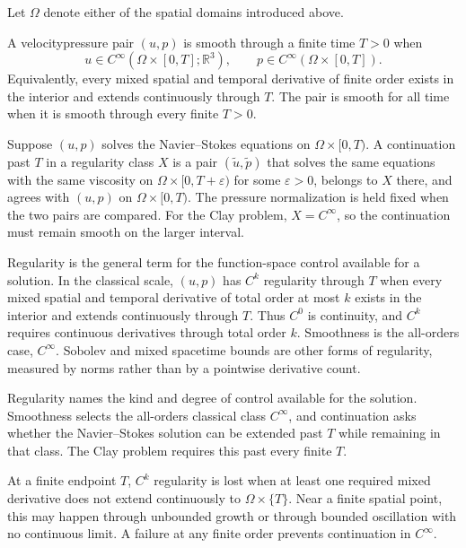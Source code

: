 
Let \(\Omega\) denote either of the spatial domains introduced above.

\begin{definition}[Smoothness]\label{def:Smoothness}
A velocity\textendash pressure pair \((u,p)\) is smooth through a finite time \(T>0\) when
\[
  u\in C^\infty\!\left(\Omega\times[0,T];\mathbb R^3\right),
  \qquad
  p\in C^\infty\!\left(\Omega\times[0,T]\right).
\]
Equivalently, every mixed spatial and temporal derivative of finite order exists in the interior and extends continuously through \(T\).
The pair is smooth for all time when it is smooth through every finite \(T>0\).
\end{definition}

\begin{definition}[Continuation]\label{def:Continuation}
Suppose \((u,p)\) solves the Navier--Stokes equations on \(\Omega\times[0,T)\).
A continuation past \(T\) in a regularity class \(X\) is a pair \((\widetilde u,\widetilde p)\) that solves the same equations with the same viscosity on \(\Omega\times[0,T+\varepsilon)\) for some \(\varepsilon>0\), belongs to \(X\) there, and agrees with \((u,p)\) on \(\Omega\times[0,T)\).
The pressure normalization is held fixed when the two pairs are compared.
For the Clay problem, \(X=C^\infty\), so the continuation must remain smooth on the larger interval.
\end{definition}

\begin{definition}[Regularity]\label{def:Regularity}
Regularity is the general term for the function-space control available for a solution.
In the classical scale, \((u,p)\) has \(C^k\) regularity through \(T\) when every mixed spatial and temporal derivative of total order at most \(k\) exists in the interior and extends continuously through \(T\).
Thus \(C^0\) is continuity, and \(C^k\) requires continuous derivatives through total order \(k\).
Smoothness is the all-orders case, \(C^\infty\).
Sobolev and mixed space\textendash time bounds are other forms of regularity, measured by norms rather than by a pointwise derivative count.
\end{definition}

Regularity names the kind and degree of control available for the solution.
Smoothness selects the all-orders classical class \(C^\infty\), and continuation asks whether the Navier--Stokes solution can be extended past \(T\) while remaining in that class.
The Clay problem requires this past every finite \(T\).

At a finite endpoint \(T\), \(C^k\) regularity is lost when at least one required mixed derivative does not extend continuously to \(\Omega\times\{T\}\).
Near a finite spatial point, this may happen through unbounded growth or through bounded oscillation with no continuous limit.
A failure at any finite order prevents continuation in \(C^\infty\).
